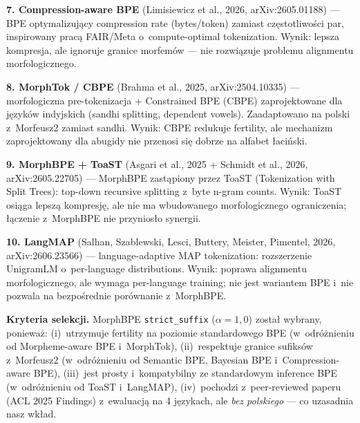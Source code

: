 \textbf{7. Compression-aware BPE} (Limisiewicz et al., 2026,
arXiv:2605.01188) --- BPE optymalizujący compression rate
(bytes/token) zamiast częstotliwości par, inspirowany pracą
FAIR/Meta o~compute-optimal tokenization. Wynik: lepsza
kompresja, ale ignoruje granice morfemów --- nie rozwiązuje
problemu alignmentu morfologicznego.

\textbf{8. MorphTok / CBPE} (Brahma et al., 2025,
arXiv:2504.10335) --- morfologiczna pre-tokenizacja
+ Constrained BPE (CBPE) zaprojektowane dla języków indyjskich
(sandhi splitting, dependent vowels). Zaadaptowano na polski
z~Morfeusz2 zamiast sandhi. Wynik: CBPE redukuje fertility,
ale mechanizm zaprojektowany dla abugidy nie przenosi się
dobrze na alfabet łaciński.

\textbf{9. MorphBPE + ToaST} (Asgari et al., 2025 +
Schmidt et al., 2026, arXiv:2605.22705) --- MorphBPE
zastąpiony przez ToaST (Tokenization with Split Trees):
top-down recursive splitting z~byte n-gram counts. Wynik:
ToaST osiąga lepszą kompresję, ale nie ma wbudowanego
morfologicznego ograniczenia; łączenie z~MorphBPE nie
przyniosło synergii.

\textbf{10. LangMAP} (Salhan, Szablewski, Lesci, Buttery,
Meister, Pimentel, 2026, arXiv:2606.23566) --- language-adaptive
MAP tokenization: rozszerzenie UnigramLM o~per-language
distributions. Wynik: poprawa alignmentu morfologicznego,
ale wymaga per-language training; nie jest wariantem BPE
i~nie pozwala na bezpośrednie porównanie z~MorphBPE.

\medskip
\noindent
\textbf{Kryteria selekcji.} MorphBPE \texttt{strict\_suffix}
($\alpha = 1{,}0$) został wybrany, ponieważ:
(i)~utrzymuje fertility na poziomie standardowego BPE
(w~odróżnieniu od Morpheme-aware BPE i~MorphTok),
(ii)~respektuje granice sufiksów z~Morfeusz2 (w~odróżnieniu
od Semantic BPE, Bayesian BPE i~Compression-aware BPE),
(iii)~jest prosty i~kompatybilny ze standardowym inference BPE
(w~odróżnieniu od ToaST i~LangMAP),
(iv)~pochodzi z~peer-reviewed paperu (ACL 2025 Findings)
z~ewaluacją na 4 językach, ale \emph{bez polskiego} --- co
uzasadnia nasz wkład.

